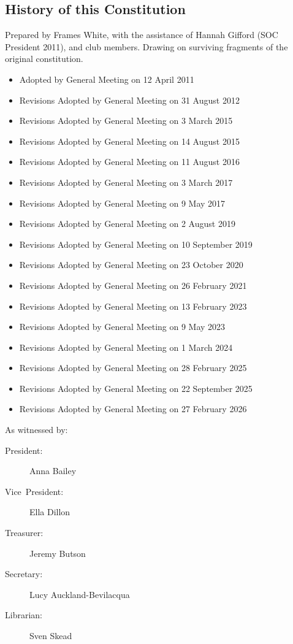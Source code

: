 \documentclass[a4paper]{article}
\begin{document}
\begin{appendices}

    \section{History of this Constitution} \label{sec:app:history}

    \noindent Prepared by Frames White, with the assistance of Hannah Gifford (SOC President 2011), and club members. Drawing on surviving fragments of the original constitution.

    \medskip{}

    \begin{itemize}[label={}]
        \item Adopted by General Meeting on 12 April 2011
        \item Revisions Adopted by General Meeting on 31 August 2012
        \item Revisions Adopted by General Meeting on 3 March 2015
        \item Revisions Adopted by General Meeting on 14 August 2015
        \item Revisions Adopted by General Meeting on 11 August 2016
        \item Revisions Adopted by General Meeting on 3 March 2017
        \item Revisions Adopted by General Meeting on 9 May 2017
        \item Revisions Adopted by General Meeting on 2 August 2019
        \item Revisions Adopted by General Meeting on 10 September 2019
        \item Revisions Adopted by General Meeting on 23 October 2020
        \item Revisions Adopted by General Meeting on 26 February 2021
        \item Revisions Adopted by General Meeting on 13 February 2023
        \item Revisions Adopted by General Meeting on 9 May 2023
        \item Revisions Adopted by General Meeting on 1 March 2024
        \item Revisions Adopted by General Meeting on 28 February 2025
        \item Revisions Adopted by General Meeting on 22 September 2025
        \item Revisions Adopted by General Meeting on 27 February 2026
    \end{itemize}

    \medskip{}

    \noindent As witnessed by:
    \begin{description}
        \item[{President:}] Anna Bailey
        \item[{Vice~President:}] Ella Dillon
        \item[{Treasurer:}] Jeremy Butson
        \item[{Secretary:}] Lucy Auckland-Bevilacqua
        \item[{Librarian:}] Sven Skead
    \end{description}

\end{appendices}
\end{document}
